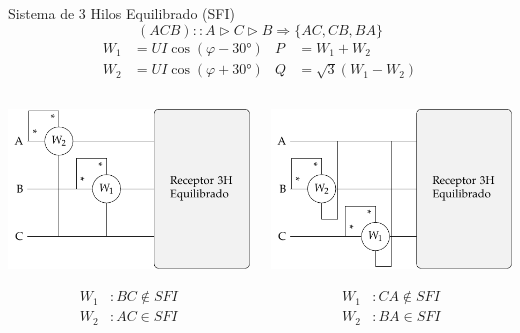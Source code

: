 \documentclass[aspectratio=169, usenames,svgnames,dvipsnames]{beamer}
\begin{document}
\begin{frame}[label={sec:org9d0dd9c},plain]{Sistema de 3 Hilos Equilibrado (SFI)}
\[
  \boxed{(ACB) :: A \triangleright C \triangleright B \Longrightarrow \{AC, CB, BA\}}
\]
\begin{align*}
  W_1 &= UI\cos(\varphi - \ang{30}) & P &= W_1 + W_2\\
  W_2 &= UI\cos(\varphi + \ang{30}) & Q &= \sqrt{3}(W_1 - W_2)
\end{align*}
\begin{columns}
\begin{column}{0.33\columnwidth}
\begin{center}
\includegraphics[width=.9\linewidth]{../figs/Potencia3H_Equilibrado_AB_SFI.pdf}
\end{center}
\begin{align*}
  W_1&: BC \notin SFI\\
  W_2&: AC \in SFI\\
\end{align*}
\end{column}
\begin{column}{0.33\columnwidth}
\begin{center}
\includegraphics[width=.9\linewidth]{../figs/Potencia3H_Equilibrado_BC_SFI.pdf}
\end{center}
\begin{align*}
  W_1&: CA \notin SFI\\
  W_2&: BA \in SFI\\
\end{align*}
\end{column}


\end{columns}
\end{frame}
\end{document}
